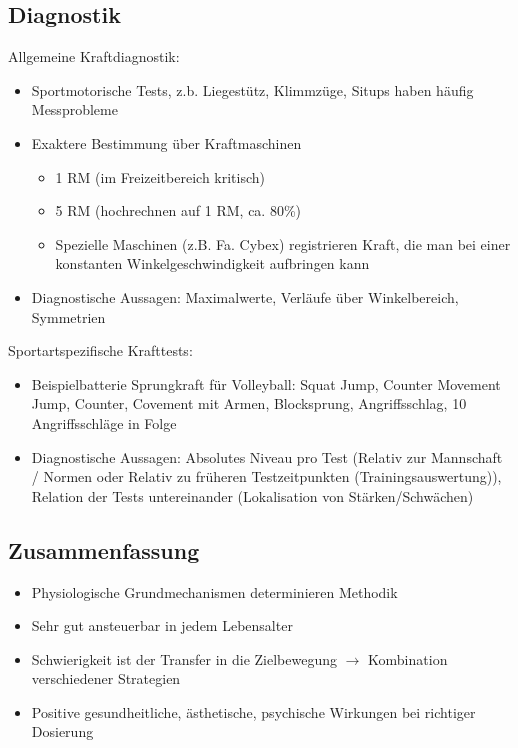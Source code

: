 \subsection{Diagnostik}
Allgemeine Kraftdiagnostik:
\begin{itemize}
    \item Sportmotorische Tests, z.b. Liegestütz, Klimmzüge, Situps haben häufig Messprobleme
    \item Exaktere Bestimmung über Kraftmaschinen
    \begin{itemize}
        \item 1 RM (im Freizeitbereich kritisch)
        \item 5 RM (hochrechnen auf 1 RM, ca. 80\%)
        \item Spezielle Maschinen (z.B. Fa. Cybex) registrieren Kraft, die man bei einer konstanten Winkelgeschwindigkeit aufbringen kann
    \end{itemize}
    \item Diagnostische Aussagen: Maximalwerte, Verläufe über Winkelbereich, Symmetrien
\end{itemize}
Sportartspezifische Krafttests:
\begin{itemize}
    \item Beispielbatterie Sprungkraft für Volleyball: Squat Jump, Counter Movement Jump, Counter, Covement mit Armen, Blocksprung, Angriffsschlag, 10 Angriffsschläge in Folge
    \item Diagnostische Aussagen: Absolutes Niveau pro Test (Relativ zur Mannschaft / Normen oder Relativ zu früheren Testzeitpunkten (Trainingsauswertung)), Relation der Tests untereinander (Lokalisation von Stärken/Schwächen)
\end{itemize}

\subsection{Zusammenfassung}
\begin{itemize}
    \item Physiologische Grundmechanismen determinieren Methodik
    \item Sehr gut ansteuerbar in jedem Lebensalter
    \item Schwierigkeit ist der Transfer in die Zielbewegung $\rightarrow$ Kombination verschiedener Strategien
    \item Positive gesundheitliche, ästhetische, psychische Wirkungen bei richtiger Dosierung
\end{itemize}
